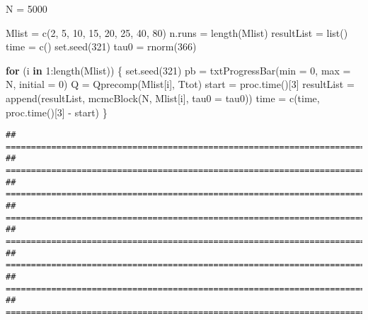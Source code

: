 \documentclass[
]{article}
\newenvironment{Shaded}{\begin{snugshade}}{\end{snugshade}}
\newcommand{\AttributeTok}[1]{\textcolor[rgb]{0.77,0.63,0.00}{#1}}
\newcommand{\ControlFlowTok}[1]{\textcolor[rgb]{0.13,0.29,0.53}{\textbf{#1}}}
\newcommand{\DecValTok}[1]{\textcolor[rgb]{0.00,0.00,0.81}{#1}}
\newcommand{\FunctionTok}[1]{\textcolor[rgb]{0.00,0.00,0.00}{#1}}
\newcommand{\NormalTok}[1]{#1}
\newcommand{\OtherTok}[1]{\textcolor[rgb]{0.56,0.35,0.01}{#1}}
\newcommand{\SpecialCharTok}[1]{\textcolor[rgb]{0.00,0.00,0.00}{#1}}
\begin{document}
\begin{Shaded}
\begin{Highlighting}[]
\NormalTok{N }\OtherTok{=} \DecValTok{5000}

\NormalTok{Mlist }\OtherTok{=} \FunctionTok{c}\NormalTok{(}\DecValTok{2}\NormalTok{, }\DecValTok{5}\NormalTok{, }\DecValTok{10}\NormalTok{, }\DecValTok{15}\NormalTok{, }\DecValTok{20}\NormalTok{, }\DecValTok{25}\NormalTok{, }\DecValTok{40}\NormalTok{, }\DecValTok{80}\NormalTok{)}
\NormalTok{n.runs }\OtherTok{=} \FunctionTok{length}\NormalTok{(Mlist)}
\NormalTok{resultList }\OtherTok{=} \FunctionTok{list}\NormalTok{()}
\NormalTok{time }\OtherTok{=} \FunctionTok{c}\NormalTok{()}
\FunctionTok{set.seed}\NormalTok{(}\DecValTok{321}\NormalTok{)}
\NormalTok{tau0 }\OtherTok{=} \FunctionTok{rnorm}\NormalTok{(}\DecValTok{366}\NormalTok{)}

\ControlFlowTok{for}\NormalTok{ (i }\ControlFlowTok{in} \DecValTok{1}\SpecialCharTok{:}\FunctionTok{length}\NormalTok{(Mlist)) \{}
    \FunctionTok{set.seed}\NormalTok{(}\DecValTok{321}\NormalTok{)}
\NormalTok{    pb }\OtherTok{=} \FunctionTok{txtProgressBar}\NormalTok{(}\AttributeTok{min =} \DecValTok{0}\NormalTok{, }\AttributeTok{max =}\NormalTok{ N, }\AttributeTok{initial =} \DecValTok{0}\NormalTok{)}
\NormalTok{    Q }\OtherTok{=} \FunctionTok{Qprecomp}\NormalTok{(Mlist[i], Ttot)}
\NormalTok{    start }\OtherTok{=} \FunctionTok{proc.time}\NormalTok{()[}\DecValTok{3}\NormalTok{]}
\NormalTok{    resultList }\OtherTok{=} \FunctionTok{append}\NormalTok{(resultList, }\FunctionTok{mcmcBlock}\NormalTok{(N, Mlist[i], }\AttributeTok{tau0 =}\NormalTok{ tau0))}
\NormalTok{    time }\OtherTok{=} \FunctionTok{c}\NormalTok{(time, }\FunctionTok{proc.time}\NormalTok{()[}\DecValTok{3}\NormalTok{] }\SpecialCharTok{{-}}\NormalTok{ start)}
\NormalTok{\}}
\end{Highlighting}
\end{Shaded}

\begin{verbatim}
## ================================================================================
## ================================================================================
## ================================================================================
## ================================================================================
## ================================================================================
## ================================================================================
## ================================================================================
## ================================================================================
\end{verbatim}
\end{document}
